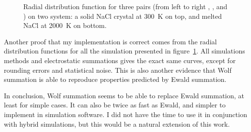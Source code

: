 \documentclass[thesis]{subfiles}
\begin{document}
\begin{figure}[b]
    \centering
    
    \caption{Radial distribution function for three pairs (from left to right
    , , and ) on two system: a solid NaCl crystal
    at \SI{300}{K} on top, and melted NaCl at \SI{2000}{K} on bottom.}
    \label{fig:ewald-vs-wolf:rdf}
\end{figure}

Another proof that my implementation is correct comes from the radial
distribution functions for all the simulation presented in
figure~\ref{fig:ewald-vs-wolf:rdf}. All simulations methods and electrostatic
summations gives the exact same curves, except for rounding errors and
statistical noise. This is also another evidence that Wolf summation is able to
reproduce properties predicted by Ewald summation.

In conclusion, Wolf summation seems to be able to replace Ewald summation, at
least for simple cases. It can also be twice as fast as Ewald, and simpler to
implement in simulation software. I did not have the time to use it in
conjunction with hybrid simulations, but this would be a natural extension of
this work.

\OnlyInSubfile{\printglobalbibliography}
\end{document}
